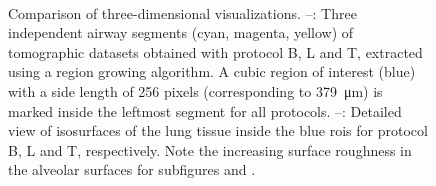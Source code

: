 \begin{figure}
{{%
			\label{subfig:roiT}%
		}%
	}%
	\\%
	\caption[Comparison of three-dimensional visualizations]{Comparison of three-dimensional visualizations. %
			--: Three independent airway segments (cyan, magenta, yellow) of tomographic datasets obtained with protocol B, L and T, extracted using a region growing algorithm. A cubic region of interest (blue) with a side length of 256 pixels (corresponding to \SI{379}{\micro\meter}) is marked inside the leftmost segment for all protocols. %
			--: Detailed view of isosurfaces of the lung tissue inside the blue \acp{roi} for protocol B, L and T, respectively. Note the increasing surface roughness in the alveolar surfaces for subfigures  and .}%
	\label{fig:BvsT}
\end{figure}%

